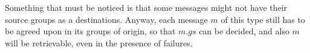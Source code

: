 \documentclass[times, 10pt]{article}
\begin{document}
Something that must be noticed is that some messages might not have their source groups as a destinations. Anyway, each message $m$ of this type still has to be agreed upon in its groups of origin, so that $m.gs$ can be decided, and also $m$ will be retrievable, even in the presence of failures.%
\end{document}

